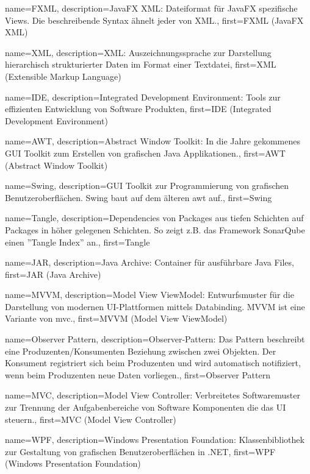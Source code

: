 {
	name={FXML},
	description={JavaFX XML: Dateiformat für JavaFX spezifische Views. Die beschreibende Syntax ähnelt jeder von XML.},
	first={FXML (JavaFX XML)}
}

{
	name={XML},
	description={XML: Auszeichnungssprache zur Darstellung hierarchisch strukturierter Daten im Format einer Textdatei},
	first={XML (Extensible Markup Language)}
}

{
	name={IDE},
	description={Integrated Development Environment: Tools zur effizienten Entwicklung von Software Produkten},
	first={IDE (Integrated Development Environment)}
}

{
	name={AWT},
	description={Abstract Window Toolkit: In die Jahre gekommenes GUI Toolkit zum Erstellen von grafischen Java Applikationen.},
	first={AWT (Abstract Window Toolkit)}
}

{
	name={Swing},
	description={GUI Toolkit zur Programmierung von grafischen Benutzeroberflächen. Swing baut auf dem älteren \gls{awt} auf.},
	first={Swing}
}

{
	name={Tangle},
	description={Dependencies von Packages aus tiefen Schichten auf Packages in höher gelegenen Schichten. So zeigt z.B. das Framework SonarQube einen ''Tangle Index'' an.},
	first={Tangle}
}


{
	name={JAR},
	description={Java Archive: Container für ausführbare Java Files},
	first={JAR (Java Archive)}
}

{
	name={MVVM},
	description={Model View ViewModel: Entwurfsmuster für die Darstellung von modernen UI-Plattformen mittels Databinding. MVVM ist eine Variante von \gls{mvc}.},
	first={MVVM (Model View ViewModel)}
}

{
	name={Observer Pattern},
	description={Observer-Pattern: Das Pattern beschreibt eine Produzenten/Konsumenten Beziehung zwischen zwei Objekten. Der Konsument registriert sich beim Produzenten und wird automatisch notifiziert, wenn beim Produzenten neue Daten vorliegen.},
	first={Observer Pattern}
}

{
	name={MVC},
	description={Model View Controller: Verbreitetes Softwaremuster zur Trennung der Aufgabenbereiche von Software Komponenten die das UI steuern.},
	first={MVC (Model View Controller)}
}

{
	name={WPF},
	description={Windows Presentation Foundation: Klassenbibliothek zur Gestaltung von grafischen Benutzeroberflächen in .NET},
	first={WPF (Windows Presentation Foundation)}
}

